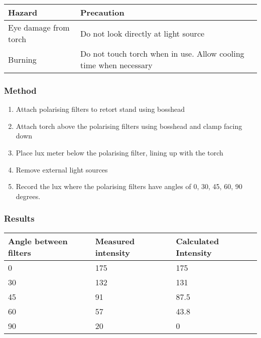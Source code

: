 \documentclass{report}
\begin{document}
			\begin{table}[H]
				\centering
				\begin{tabular}{p{7cm}|p{7cm}}
					\textbf{Hazard}			& \textbf{Precaution}		\\ \hline
					Eye damage from torch		& Do not look directly at light source \\
					Burning				& Do not touch torch when in use. Allow cooling time when necessary
				\end{tabular}
			\end{table}

		\subsubsection{Method}
			
			\begin{enumerate}
				\item Attach polarising filters to retort stand using bosshead
				\item Attach torch above the polarising filters using bosshead and clamp facing down
				\item Place lux meter below the polarising filter, lining up with the torch
				\item Remove external light sources
				\item Record the lux where the polarising filters have angles of 0, 30, 45, 60, 90 degrees.
			\end{enumerate}

		\subsubsection{Results}
		
			\begin{table}[H]
				\centering
				\begin{tabular}{p{4cm}|p{4cm}|p{4cm}}
					\textbf{Angle between filters}		& \textbf{Measured intensity}		& \textbf{Calculated Intensity}		\\ \hline
					0					& 175					& 175					\\
					30					& 132					& 131					\\
					45					& 91					& 87.5					\\
					60					& 57					& 43.8					\\
					90					& 20					& 0					\\
				\end{tabular}
			\end{table}
\end{document}
